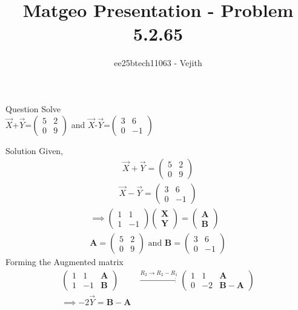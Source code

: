 \documentclass{beamer}
\title{Matgeo Presentation - Problem 5.2.65}
\author{ee25btech11063 - Vejith}
\numberwithin{equation}{section}
\theoremstyle{remark}
\newcommand{\myvec}[1]{\ensuremath{\begin{pmatrix}#1\end{pmatrix}}}
\let\vec\mathbf
\begin{document}
\frame{\titlepage}
\begin{frame}{Question}
Solve\\
$\Vec{X}$+$\Vec{Y}$=$\begin{pmatrix}
    5 & 2\\
    0 & 9
\end{pmatrix}$ and $\Vec{X}$-$\Vec{Y}$=$\begin{pmatrix}
    3 & 6\\
    0 & -1
\end{pmatrix}$
\end{frame}

\begin{frame}{Solution}
Given,
\begin{align}
    \Vec{X}+\Vec{Y}=\begin{pmatrix}
    5 & 2\\
    0 & 9
    \end{pmatrix}
\end{align}
\begin{align}
    \Vec{X}-\Vec{Y}=\begin{pmatrix}
    3 & 6\\
    0 & -1
\end{pmatrix}
\end{align}
\begin{align}
    \implies \begin{pmatrix}
        1 & 1\\
         1 & -1
    \end{pmatrix} \myvec{\vec{X}\\\vec{Y}}=\myvec{\vec{A}\\ \vec{B}}\\
     \vec{A}= \begin{pmatrix}
    5 & 2\\
    0 & 9
\end{pmatrix} \text{ and } \vec{B}=\begin{pmatrix}
    3 & 6\\
    0 & -1
\end{pmatrix}
    \end{align}
Forming the Augmented matrix
\begin{align}
\left(\begin{array}{cc|c}
1 & 1 & \vec{A}\\
1 & -1 & \vec{B}
\end{array}\right)  &\xrightarrow{R_2 \rightarrow R_2-R_1} \left(\begin{array}{cc|c}
1 & 1 & \vec{A}\\
0 & -2 & \vec{B-A}
\end{array}\right)\\
\implies -2\Vec{Y}=\vec{B-A}
\end{align}
\end{frame}
\end{document}
